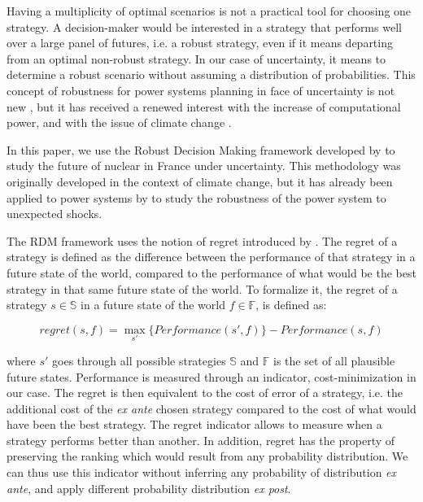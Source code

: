 Having a multiplicity of optimal scenarios is not a practical tool for choosing one strategy. A decision-maker would be interested in a strategy that performs well over a large panel of futures, i.e. a robust strategy, even if it means departing from an optimal non-robust strategy. 
In our case of uncertainty, it means to determine a robust scenario without assuming a distribution of probabilities. This concept of robustness for power systems planning in face of uncertainty is not new \citep{Burke1988, Linares2002}, but it has received a renewed interest with the increase of computational power, and with the issue of climate change \citep{Hallegatte2009}.

In this paper, we use the Robust Decision Making framework developed by \citet{Lempert2006} to study the future of nuclear in France under uncertainty. This methodology was originally developed in the context of climate change, but it has already been applied to power systems by \citet{Nahmmacher2016} to study the robustness of the power system to unexpected shocks. 

The RDM framework uses the notion of regret introduced by \citet{Savage1950}. The regret of a strategy is defined as the difference between the performance of that strategy in a future state of the world, compared to the performance of what would be the best strategy in that same future state of the world. To formalize it, the regret of a strategy $s \in \mathbb{S}$ in a future state of the world $f \in \mathbb{F}$, is defined as:

$$regret(s,f) = \max_{s'} \{Performance(s',f)\}-Performance(s,f)$$

where $s'$ goes through all possible strategies $\mathbb{S}$ and $\mathbb{F}$ is the set of all plausible future states. Performance is measured through an indicator, cost-minimization in our case. The regret is then equivalent to the cost of error of a strategy, i.e. the additional cost of the \textit{ex ante} chosen strategy compared to the cost of what would have been the best strategy.
The regret indicator allows to measure when a strategy performs better than another. In addition, regret has the property of preserving the ranking which would result from any probability distribution. We can thus use this indicator without inferring any probability of distribution \textit{ex ante}, and apply different probability distribution \textit{ex post}.

